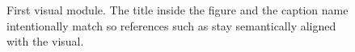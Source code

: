 \begin{figure}[t]
  \centering
  \caption{First visual module. The title inside the figure and the caption name
  intentionally match so references such as  stay
  semantically aligned with the visual.}
  \label{fig:first_visual_module}
\end{figure}
